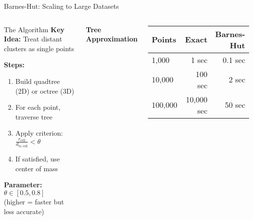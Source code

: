 \documentclass[aspectratio=169]{beamer}
\begin{document}
\begin{frame}{Barnes-Hut: Scaling to Large Datasets}
\begin{columns}
\begin{block}{The Algorithm}
\textbf{Key Idea:} Treat distant clusters as single points

\textbf{Steps:}
\begin{enumerate}
\item Build quadtree (2D) or octree (3D)
\item For each point, traverse tree
\item Apply criterion: $\frac{r_{\text{cell}}}{d_{\text{to cell}}} < \theta$
\item If satisfied, use center of mass
\end{enumerate}

\textbf{Parameter:} $\theta \in [0.5, 0.8]$\\
\small (higher = faster but less accurate)
\end{block}

\begin{center}
\textbf{Tree Approximation}\\[2mm]
\end{center}

\begin{center}
\begin{tabular}{l|r|r}
\textbf{Points} & \textbf{Exact} & \textbf{Barnes-Hut} \\
\hline
1,000 & 1 sec & 0.1 sec \\
10,000 & 100 sec & 2 sec \\
100,000 & 10,000 sec & 50 sec \\
\end{tabular}
\end{center}
\end{columns}
\end{frame}
\end{document}
